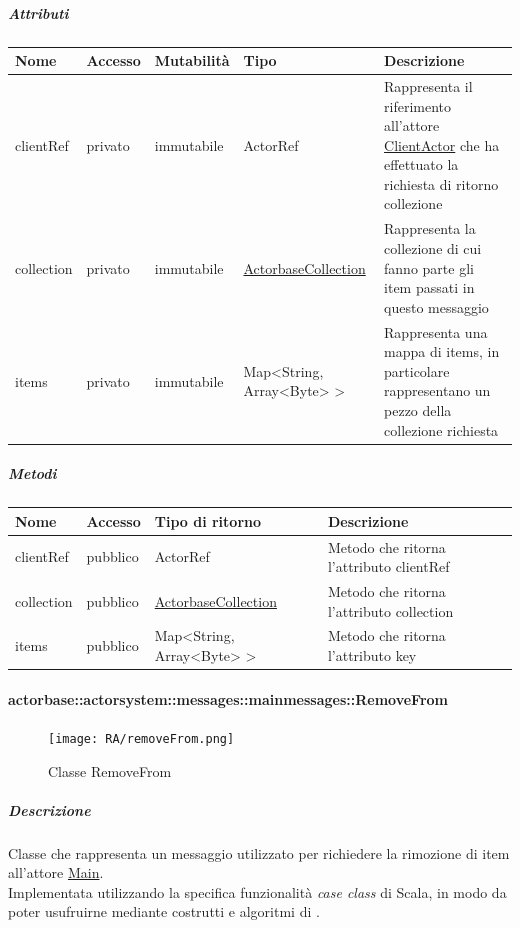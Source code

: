 \documentclass{scalatekids-article}
\begin{document}
\subparagraph{Attributi}
\begin{tabular}{| p{2cm} | p{1.5cm} | p{2cm} | p{3cm} | p{8.5cm} |}
  \hline
  Nome & Accesso & Mutabilità & Tipo & Descrizione\\
  \hline
  clientRef & privato & immutabile & ActorRef & Rappresenta il riferimento all'attore \hyperref[sec:actorbase::actorsystem::actors::clientactor::ClientActor]{ClientActor} che ha effettuato la richiesta di ritorno collezione\\
  \hline
  collection & privato & immutabile & \hyperref[sec:actorbase::actorsystem::utils::ActorbaseCollection]{ActorbaseCollection} & Rappresenta la collezione di cui fanno parte gli item passati in questo messaggio\\
  \hline
  items & privato & immutabile & Map<String, Array<Byte> > & Rappresenta una mappa di items, in particolare rappresentano un pezzo della collezione richiesta\\
  \hline
\end{tabular}

\subparagraph{Metodi}
\begin{tabular}{| p{3cm} | p{1.5cm} | p{3.5cm} | p{9cm} |}
  \hline
  Nome & Accesso & Tipo di ritorno & Descrizione\\
  \hline
  clientRef & pubblico & ActorRef & Metodo che ritorna l'attributo clientRef\\
  \hline
  collection & pubblico & \hyperref[sec:actorbase::actorsystem::utils::ActorbaseCollection]{ActorbaseCollection} & Metodo che ritorna l'attributo collection\\
  \hline
  items & pubblico & Map<String, Array<Byte> > & Metodo che ritorna l'attributo key\\
  \hline
\end{tabular}

\paragraph{actorbase::actorsystem::messages::mainmessages::RemoveFrom}
\label{sec:actorbase::actorsystem::messages::mainmessages::RemoveFrom}

\begin{figure}[H]
  \begin{center}
    \texttt{[image: RA/removeFrom.png]}
    \caption{Classe RemoveFrom}
  \end{center}
\end{figure}

\subparagraph{Descrizione}
Classe che rappresenta un messaggio utilizzato per richiedere la rimozione di
item all'attore \hyperref[sec:actorbase::actorsystem::actors::main::Main]{Main}.\\Implementata utilizzando la specifica funzionalità \textit{case class} di Scala, in modo da poter usufruirne mediante costrutti e algoritmi di
.
\end{document}
